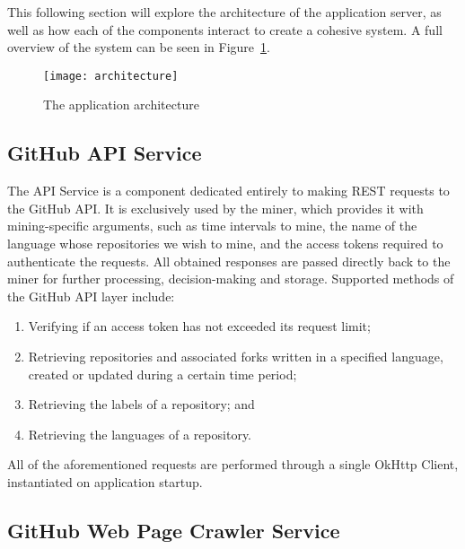 This following section will explore the architecture of the application server, as well as how each of the components interact to create a cohesive system.
A full overview of the system can be seen in Figure~\ref{fig:2}.

\begin{figure}[h!]
    \centering
    \texttt{[image: architecture]}
    \caption{The application architecture}
    \label{fig:2}
\end{figure}

\subsection{GitHub API Service}

The API Service is a component dedicated entirely to making REST requests to the GitHub API\@.
It is exclusively used by the miner, which provides it with mining-specific arguments, such as time intervals to mine, the name of the language whose repositories we wish to mine, and the access tokens required to authenticate the requests.
All obtained responses are passed directly back to the miner for further processing, decision-making and storage.
Supported methods of the GitHub API layer include:
\begin{enumerate}
    \item Verifying if an access token has not exceeded its request limit;
    \item Retrieving repositories and associated forks written in a specified language, created or updated during a certain time period;
    \item Retrieving the labels of a repository; and
    \item Retrieving the languages of a repository.
\end{enumerate}
All of the aforementioned requests are performed through a single OkHttp Client, instantiated on application startup.

\subsection{GitHub Web Page Crawler Service}

